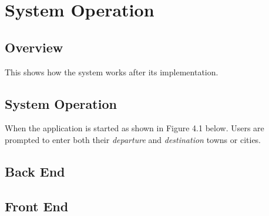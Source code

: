 
\chapter{System Operation} %



\ifpdf
    \graphicspath{{4/figures/PNG/}{4/figures/PDF/}{4/figures/}}
\else
    \graphicspath{{4/figures/EPS/}{4/figures/}}
\fi

\section{Overview}
This shows how the system works after its implementation. 

\section{System Operation}
When the application is started as shown in Figure 4.1 below. Users are prompted to enter both their \textit{departure} and \textit{destination} towns or cities.


\section{Back End}


\section{Front End}







